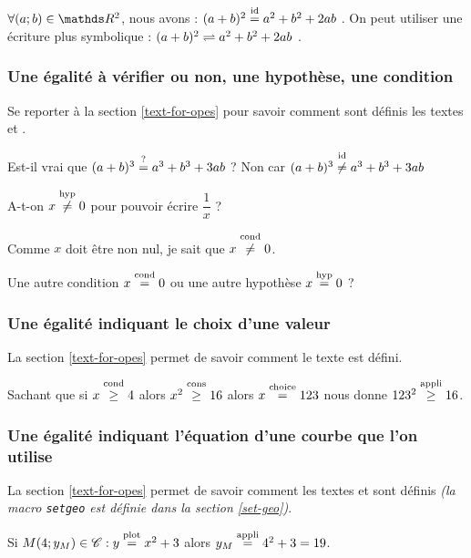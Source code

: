 \documentclass[12pt,a4paper]{article}
\theoremstyle{definition}
\begin{document}
\begin{tcblisting}{}
$\forall (a ; b) \in \RR^2$, nous avons : $(a + b)^2 \eqid a^2 + b^2 + 2 a b$ .
On peut utiliser une écriture plus symbolique : $(a + b)^2 \eqid* a^2 + b^2 + 2 a b$ .
\end{tcblisting}


\subsubsection{Une égalité à vérifier ou non, une hypothèse, une condition}

Se reporter à la section \ref{text-for-opes} pour savoir comment sont définis les textes \emph{\og \textopcond \fg} et \emph{\og \textophyp \fg}.

\begin{tcblisting}{}
Est-il vrai que $(a + b)^3 \eqtest a^3 + b^3 + 3 a b$ ?
Non car $(a + b)^3 \neqid a^3 + b^3 + 3 a b$

A-t-on $x \neqhyp 0$ pour pouvoir écrire $\dfrac{1}{x}$ ?

Comme $x$ doit être non nul, je sait que $x \neqcond 0$.

Une autre condition $x \eqcond 0$ ou une autre hypothèse $x \eqhyp 0$ ?
\end{tcblisting}


\subsubsection{Une égalité indiquant le choix d'une valeur}

La section \ref{text-for-opes} permet de savoir comment le texte \emph{\og \textopchoice \fg} est défini.

\begin{tcblisting}{}
Sachant que si $x \geqcond 4$ alors $x^2 \geqcons 16$ alors $x \eqchoice 123$ nous
donne $123^2 \geqappli 16$.
\end{tcblisting}


\subsubsection{Une égalité indiquant l'équation d'une courbe que l'on utilise}

La section \ref{text-for-opes} permet de savoir comment les textes \emph{\og \textopplot \fg} et \emph{\og \textopappli \fg} sont définis \emph{(la macro \emph{\texttt{setgeo}} est définie dans la section \ref{set-geo})}.

\begin{tcblisting}{}
Si $M(4 ; y_M) \in \setgeo{C}: y \eqplot x^2 + 3$ alors $y_M \eqappli 4^2 + 3 = 19$.
\end{tcblisting}
\end{document}
